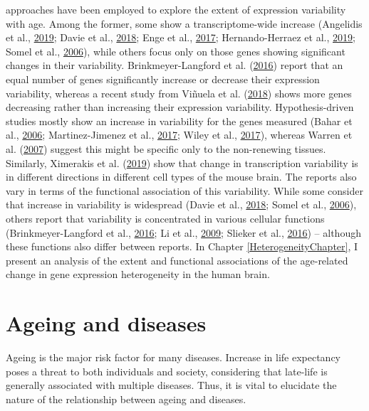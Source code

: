 \documentclass[12pt,twoside]{unicam}
\begin{document}
approaches have been employed to explore the extent of expression variability with age. Among the former, some show a transcriptome-wide increase (Angelidis et al., \protect\hyperlink{ref-Angelidis2019}{2019}; Davie et al., \protect\hyperlink{ref-Davie2018}{2018}; Enge et al., \protect\hyperlink{ref-Enge2017}{2017}; Hernando-Herraez et al., \protect\hyperlink{ref-Hernando-Herraez2019}{2019}; Somel et al., \protect\hyperlink{ref-Somel2006}{2006}), while others focus only on those genes showing significant changes in their variability. Brinkmeyer-Langford et al. (\protect\hyperlink{ref-Brinkmeyer-Langford2016}{2016}) report that an equal number of genes significantly increase or decrease their expression variability, whereas a recent study from Viñuela et al. (\protect\hyperlink{ref-Vinuela2018}{2018}) shows more genes decreasing rather than increasing their expression variability. Hypothesis-driven studies mostly show an increase in variability for the genes measured (Bahar et al., \protect\hyperlink{ref-Bahar2006}{2006}; Martinez-Jimenez et al., \protect\hyperlink{ref-Martinez-Jimenez2017}{2017}; Wiley et al., \protect\hyperlink{ref-Wiley2017}{2017}), whereas Warren et al. (\protect\hyperlink{ref-Warren2007}{2007}) suggest this might be specific only to the non-renewing tissues. Similarly, Ximerakis et al. (\protect\hyperlink{ref-Ximerakis2019}{2019}) show that change in transcription variability is in different directions in different cell types of the mouse brain. The reports also vary in terms of the functional association of this variability. While some consider that increase in variability is widespread (Davie et al., \protect\hyperlink{ref-Davie2018}{2018}; Somel et al., \protect\hyperlink{ref-Somel2006}{2006}), others report that variability is concentrated in various cellular functions (Brinkmeyer-Langford et al., \protect\hyperlink{ref-Brinkmeyer-Langford2016}{2016}; Li et al., \protect\hyperlink{ref-Li2009}{2009}; Slieker et al., \protect\hyperlink{ref-Slieker2016}{2016}) -- although these functions also differ between reports. In Chapter \ref{HeterogeneityChapter}, I present an analysis of the extent and functional associations of the age-related change in gene expression heterogeneity in the human brain.

\hypertarget{introAgeingDisease}{%
\section{Ageing and diseases}\label{introAgeingDisease}}

Ageing is the major risk factor for many diseases. Increase in life expectancy poses a threat to both individuals and society, considering that late-life is generally associated with multiple diseases. Thus, it is vital to elucidate the nature of the relationship between ageing and diseases.
\end{document}
